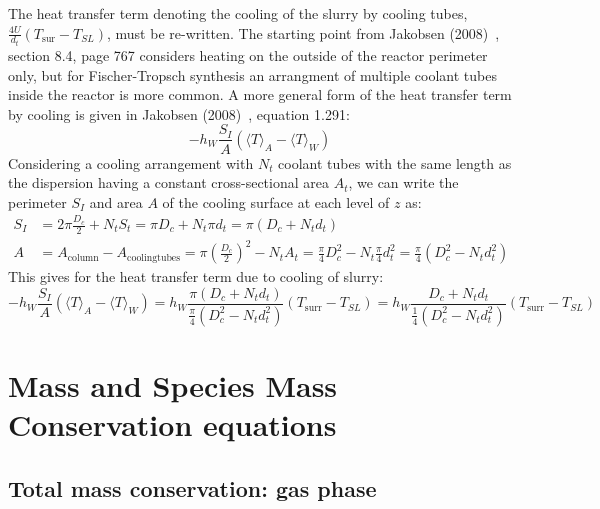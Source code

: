 \documentclass{article}
\begin{document}
The heat transfer term denoting the cooling of the slurry by cooling tubes, $\frac{4U}{d_t}(T_{\mathrm{sur}}-T_{SL})$, must be re-written. The starting point from Jakobsen (2008)~\cite{Jakobsen08}, section 8.4, page 767 considers heating on the outside of the reactor perimeter only, but for Fischer-Tropsch synthesis an arrangment of multiple coolant tubes inside the reactor is more common. A more general form of the heat transfer term by cooling is given in Jakobsen (2008)~\cite{Jakobsen08}, equation 1.291:
\begin{equation}
	-h_W\frac{S_I}{A}(\langle T\rangle_A -\langle T \rangle_W)
\end{equation}
Considering a cooling arrangement with $N_t$ coolant tubes with the same length as the dispersion having a constant cross-sectional area $A_t$, we can write the perimeter $S_I$ and area $A$ of the cooling surface at each level of $z$ as:
\begin{equation}
	\begin{split}
		S_I &= 2\pi\frac{D_c}{2} + N_tS_t = \pi D_c + N_t\pi d_t = \pi \left(D_c + N_td_t \right)\\
		A &= A_{\mathrm{column}}-A_{\mathrm{cooling tubes}} = \pi \left(\frac{D_c}{2}\right)^2 - N_tA_t = \frac{\pi}{4}D_c^2 - N_t\frac{\pi}{4}d_t^2 = \frac{\pi}{4}\left(D_c^2-N_td_t^2\right)
	\end{split}
\end{equation}
This gives for the heat transfer term due to cooling of slurry:
\begin{equation}
	-h_W\frac{S_I}{A}(\langle T\rangle_A -\langle T \rangle_W) = h_W\frac{\pi \left(D_c + N_td_t \right)}{\frac{\pi}{4}\left(D_c^2-N_td_t^2\right)}(T_{\mathrm{surr}}-T_{SL}) =h_W \frac{D_c + N_td_t}{\frac{1}{4}(D_c^2-N_td_t^2)} (T_{\mathrm{surr}}-T_{SL})
\end{equation}


\section{Mass and Species Mass Conservation equations}

\subsection{Total mass conservation: gas phase}
\end{document}
